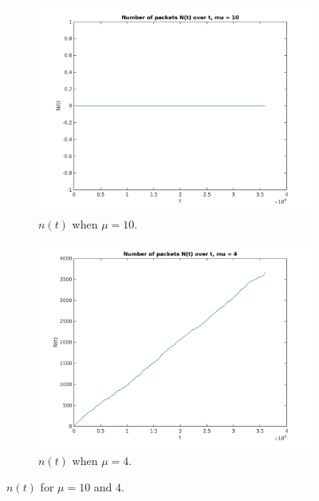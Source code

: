 \documentclass{article}
\begin{document}
		\begin{figure}[!hbt]
			\centering
			\begin{subfigure}[!hbt]{0.45\linewidth}
				\centering
				\includegraphics[width=1\linewidth]{hw3_3_nt_m10.png}
				\caption{$n(t)$ when $\mu = 10$.}
			\end{subfigure}
			\begin{subfigure}[!hbt]{0.45\linewidth}
				\centering
				\includegraphics[width=1\linewidth]{hw3_3_nt_m4.png}
				\caption{$n(t)$ when $\mu = 4$.}
			\end{subfigure}
			\caption{$n(t)$ for $\mu = 10$ and $4$.}
		\end{figure}

		\vfill
\end{document}
